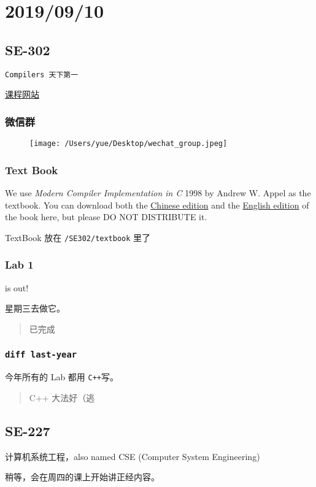 \documentclass[
]{article}
\date{}
\begin{document}
\hypertarget{header-n0}{%
\section{2019/09/10}\label{header-n0}}

\hypertarget{header-n2}{%
\subsection{SE-302}\label{header-n2}}

\texttt{Compilers\ 天下第一}

\href{https://ipads.se.sjtu.edu.cn/courses/compilers/}{课程网站}

\hypertarget{header-n5}{%
\subsubsection{微信群}\label{header-n5}}

\begin{figure}
\centering
\texttt{[image: /Users/yue/Desktop/wechat\_group.jpeg]}
\caption{}
\end{figure}

\hypertarget{header-n7}{%
\subsubsection{Text Book}\label{header-n7}}

We use \emph{Modern Compiler Implementation in C} 1998 by Andrew W.
Appel as the textbook. You can download both the
\href{https://ipads.se.sjtu.edu.cn/courses/compilers/textbook/TigerBook-Chinese.pdf}{Chinese
edition} and the
\href{https://ipads.se.sjtu.edu.cn/courses/compilers/textbook/TigerBook-English.pdf}{English
edition} of the book here, but please DO NOT DISTRIBUTE it.

TextBook 放在 \texttt{/SE302/textbook} 里了

\hypertarget{header-n10}{%
\subsubsection{Lab 1}\label{header-n10}}

is out!

星期三去做它。

\begin{quote}
已完成
\end{quote}

\hypertarget{header-n15}{%
\subsubsection{\texorpdfstring{\texttt{diff\ last-year}}{diff last-year}}\label{header-n15}}

今年所有的 Lab 都用 \texttt{C++}写。

\begin{quote}
C++ 大法好（逃
\end{quote}

\hypertarget{header-n19}{%
\subsection{SE-227}\label{header-n19}}

计算机系统工程，also named CSE (Computer System Engineering)

稍等，会在周四的课上开始讲正经内容。
\end{document}
